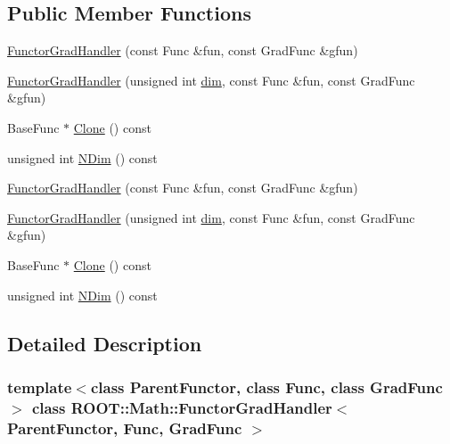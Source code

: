 \subsection*{Public Member Functions}
\begin{DoxyCompactItemize}
\item 
\mbox{\hyperlink{classROOT_1_1Math_1_1FunctorGradHandler_a139441c0174a37b1385732b0f7602ad7}{Functor\+Grad\+Handler}} (const Func \&fun, const Grad\+Func \&gfun)
\item 
\mbox{\hyperlink{classROOT_1_1Math_1_1FunctorGradHandler_a5d5fdce3fadf4956e92c0057471e75a6}{Functor\+Grad\+Handler}} (unsigned int \mbox{\hyperlink{irrep__util_8cc_a70b5e28b5bc3d1b63a7435c5fe50b837}{dim}}, const Func \&fun, const Grad\+Func \&gfun)
\item 
Base\+Func $\ast$ \mbox{\hyperlink{classROOT_1_1Math_1_1FunctorGradHandler_a20e9b0e519dc524cdf964912cf63083e}{Clone}} () const
\item 
unsigned int \mbox{\hyperlink{classROOT_1_1Math_1_1FunctorGradHandler_a9fd1149654daac8b76a15f877663ff82}{N\+Dim}} () const
\item 
\mbox{\hyperlink{classROOT_1_1Math_1_1FunctorGradHandler_a139441c0174a37b1385732b0f7602ad7}{Functor\+Grad\+Handler}} (const Func \&fun, const Grad\+Func \&gfun)
\item 
\mbox{\hyperlink{classROOT_1_1Math_1_1FunctorGradHandler_a5d5fdce3fadf4956e92c0057471e75a6}{Functor\+Grad\+Handler}} (unsigned int \mbox{\hyperlink{irrep__util_8cc_a70b5e28b5bc3d1b63a7435c5fe50b837}{dim}}, const Func \&fun, const Grad\+Func \&gfun)
\item 
Base\+Func $\ast$ \mbox{\hyperlink{classROOT_1_1Math_1_1FunctorGradHandler_a20e9b0e519dc524cdf964912cf63083e}{Clone}} () const
\item 
unsigned int \mbox{\hyperlink{classROOT_1_1Math_1_1FunctorGradHandler_a9fd1149654daac8b76a15f877663ff82}{N\+Dim}} () const
\end{DoxyCompactItemize}


\subsection{Detailed Description}
\subsubsection*{template$<$class Parent\+Functor, class Func, class Grad\+Func$>$\newline
class R\+O\+O\+T\+::\+Math\+::\+Functor\+Grad\+Handler$<$ Parent\+Functor, Func, Grad\+Func $>$}

